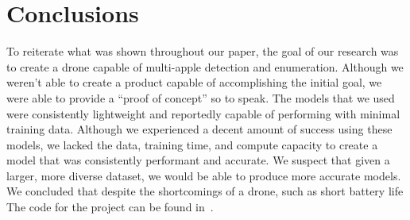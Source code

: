 \section{Conclusions}
To reiterate what was shown throughout our paper, the goal of our research was to create a drone capable of multi-apple detection and enumeration.
Although we weren't able to create a product capable of accomplishing the initial goal, we were able to provide a ``proof of concept'' so to speak.
The models that we used were consistently lightweight and reportedly capable of performing with minimal training data. 
Although we experienced a decent amount of success using these models, we lacked the data, training time, and compute capacity to create a model that was consistently performant and accurate.
We suspect that given a larger, more diverse dataset, we would be able to produce more accurate models. 
We concluded that despite the shortcomings of a drone, such as short battery life
The code for the project can be found in~\cite{FruitFly}.
